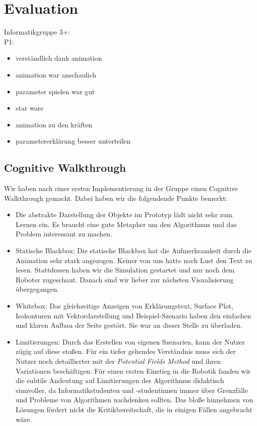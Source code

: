 \section{Evaluation}
Informatikgruppe 3+: \\
P1:
\begin{itemize}
\item verständlich dank animation
\item animation war anschaulich
\item parameter spielen war gut
\item star wars
\item animation zu den kräften
\item parametererklärung besser unterteilen
\end{itemize}

\subsection{Cognitive Walkthrough}\label{sec:cogWal}
Wir haben nach einer ersten Implementierung in der Gruppe einen Cognitive Walkthrough gemacht. Dabei haben wir die folgendende Punkte bemerkt:
\begin{itemize}
	\item Die abstrakte Darstellung der Objekte im Prototyp lädt nicht sehr zum Lernen ein. Es braucht eine gute Metapher um den Algorithmus und das Problem interessant zu machen.
	\item Statische Blackbox: Die statische Blackbox hat die Aufmerksamkeit durch die Animation sehr stark angezogen. Keiner von uns hatte noch Lust den Text zu lesen. Stattdessen haben wir die Simulation gestartet und nur noch dem Roboter zugeschaut. Danach sind wir lieber zur nächsten Visualisierung übergegangen.
	\item Whitebox: Das gleichzeitige Anzeigen von Erklärungstext, Surface Plot, Isokonturen mit Vektordarstellung und Beispiel-Szenario haben den einfachen und klaren Aufbau der Seite gestört. Sie war an dieser Stelle zu überladen.
	\item Limitierungen: Durch das Erstellen von eigenen Szenarien, kann der Nutzer zügig auf diese stoßen. Für ein tiefer gehendes Verständnis muss sich der Nutzer noch detaillierter mit der \textit{Potential Fields Method} und ihren Variationen beschäftigen. Für einen ersten Einstieg in die Robotik fanden wir die subtile Andeutung auf Limitierungen des Algorithmus didaktisch sinnvoller, da Informatikstudenten und -studentinnen immer über Grenzfälle und Probleme von Algorithmen nachdenken sollten. Das bloße hinnehmen von Lösungen fördert nicht die Kritikbereitschaft, die in einigen Fällen angebracht wäre.
\end{itemize}

